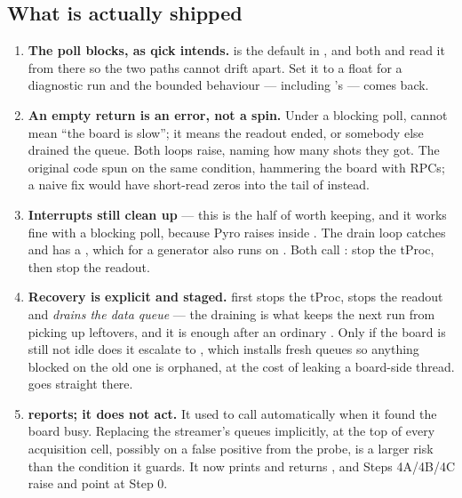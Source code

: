 \subsection{What is actually shipped}

\begin{keybox}[title=\textbf{Blocking poll, bounded cleanup, explicit recovery}]
\begin{enumerate}
  \item \textbf{The poll blocks, as qick intends.}  is
        the default in , and both  and
         read it from there so the two paths cannot drift apart. Set
        it to a float for a diagnostic run and the bounded behaviour --- including
        's  --- comes back.
  \item \textbf{An empty return is an error, not a spin.} Under a blocking poll,
        \co{[]} cannot mean ``the board is slow''; it means the readout ended, or
        somebody else drained the queue. Both loops raise, naming how many shots
        they got. The original code spun on the same condition, hammering the board
        with RPCs; a naive fix would have short-read zeros into the tail of
         instead.
  \item \textbf{Interrupts still clean up} --- this is the half of 
        worth keeping, and it works fine with a blocking poll, because Pyro raises
         inside . The drain loop catches
         and  has a , which for a
        generator also runs on . Both call :
        stop the tProc, then stop the readout.
  \item \textbf{Recovery is explicit and staged.}  first stops the
        tProc, stops the readout and \emph{drains the data queue} --- the draining
        is what keeps the next run from picking up leftovers, and it is enough
        after an ordinary . Only if the board is still not idle does it
        escalate to , which installs fresh queues
        so anything blocked on the old one is orphaned, at the cost of leaking a
        board-side thread.  goes straight there.
  \item \textbf{ reports; it does not act.} It used to call
         automatically when it found the board busy. Replacing the
        streamer's queues implicitly, at the top of every acquisition cell,
        possibly on a false positive from the probe, is a larger risk than the
        condition it guards. It now prints and returns , and Steps 4A/4B/4C
        raise and point at Step 0.
\end{enumerate}
\end{keybox}

